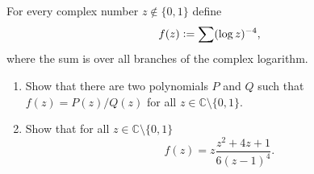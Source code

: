 \documentclass{article}
\begin{document}
\setlength{\parindent}{0pt}
For every complex number $z\notin\{0,1\}$ define$$f(z)\vcentcolon=\sum(\log z)^{-4},$$where the sum is over all branches of the complex logarithm.
\begin{enumerate}[label=\alph*)]
\item Show that there are two polynomials $P$ and $Q$ such that $f(z)=P(z)/Q(z)$ for all $z\in\mathbb{C}\setminus\{0,1\}$.
\item Show that for all $z\in\mathbb{C}\setminus\{0,1\}$$$f(z)=z\frac{z^{2}+4z+1}{6(z-1)^{4}}.$$
\end{enumerate}
\end{document}

